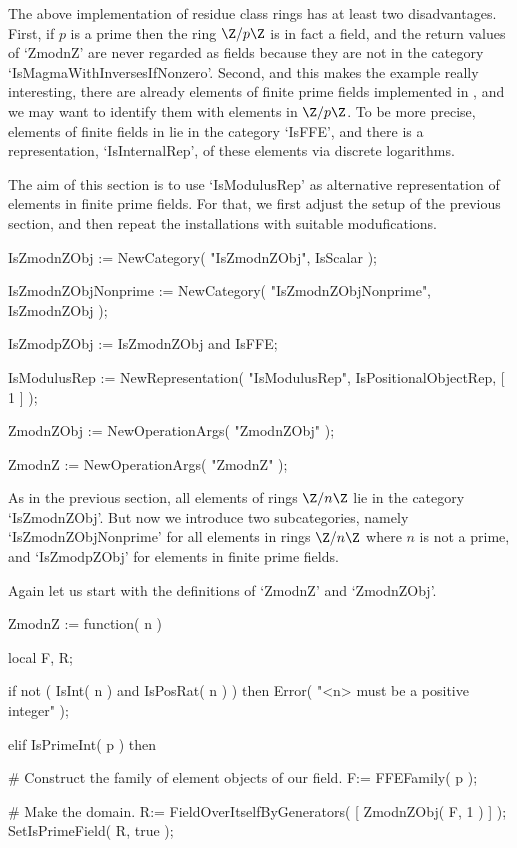 The above implementation of residue class rings has at least two
disadvantages.
First, if $p$ is a prime then the ring $\Z/p\Z$ is in fact a field,
and the return values of `ZmodnZ' are never regarded as fields because
they are not in the category `IsMagmaWithInversesIfNonzero'.
Second, and this makes the example really interesting,
there are already elements of finite prime fields implemented in {\GAP},
and we may want to identify them with elements in $\Z/p\Z$.
To be more precise,
elements of finite fields in {\GAP} lie in the category `IsFFE',
and there is a representation, `IsInternalRep', of these elements via
discrete logarithms.

The aim of this section is to use `IsModulusRep' as alternative
representation of elements in finite prime fields.
For that, we first adjust the setup of the previous section,
and then repeat the installations with suitable modufications.

\beginexample
    IsZmodnZObj := NewCategory( "IsZmodnZObj", IsScalar );

    IsZmodnZObjNonprime := NewCategory( "IsZmodnZObjNonprime",
        IsZmodnZObj );

    IsZmodpZObj := IsZmodnZObj and IsFFE;

    IsModulusRep := NewRepresentation( "IsModulusRep",
        IsPositionalObjectRep,
        [ 1 ] );

    ZmodnZObj := NewOperationArgs( "ZmodnZObj" );

    ZmodnZ := NewOperationArgs( "ZmodnZ" );
\endexample

As in the previous section,
all elements of rings $\Z/n\Z$ lie in the category `IsZmodnZObj'.
But now we introduce two subcategories, namely `IsZmodnZObjNonprime'
for all elements in rings $\Z/n\Z$ where $n$ is not a prime,
and `IsZmodpZObj' for elements in finite prime fields.

Again let us start with the definitions of `ZmodnZ' and `ZmodnZObj'.

\beginexample
    ZmodnZ := function( n )

        local F, R;

        if not ( IsInt( n ) and IsPosRat( n ) ) then
          Error( "<n> must be a positive integer" );

        elif IsPrimeInt( p ) then

          # Construct the family of element objects of our field.
          F:= FFEFamily( p );

          # Make the domain.
          R:= FieldOverItselfByGenerators( [ ZmodnZObj( F, 1 ) ] );
          SetIsPrimeField( R, true );

